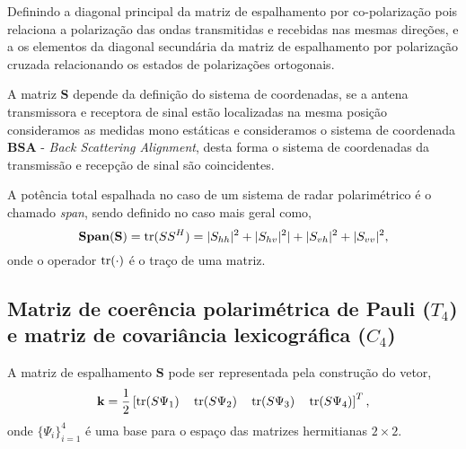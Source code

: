 Definindo a diagonal principal da matriz de espalhamento por co-polarização pois relaciona a polarização das ondas transmitidas e recebidas nas mesmas direções, e a os elementos da diagonal secundária da matriz de espalhamento por polarização cruzada relacionando os estados de polarizações ortogonais.
 
A matriz $\mathbf{S}$ depende da definição do sistema de coordenadas, se a antena transmissora e receptora de sinal estão localizadas na mesma posição consideramos as medidas mono estáticas e consideramos o sistema de coordenada \textbf{BSA} - \textit{Back Scattering Alignment}, desta forma o sistema de coordenadas da transmissão e recepção de sinal são coincidentes.   
 
A potência total espalhada no caso de um sistema de radar polarimétrico é o chamado \textit{span}, sendo definido no caso mais geral como,
\begin{equation}\label{span_geral}
\mathbf{Span(S)} = \operatorname{tr}(SS^H)=|S_{hh}|^2+|S_{hv}|^2|+|S_{vh}|^2+|S_{vv}|^2,
\end{equation}
onde o operador $\operatorname{tr}(\cdot)$ é o traço de uma matriz.


\subsection{Matriz de coerência polarimétrica de Pauli ($T_4$) e matriz de covariância lexicográfica ($C_4$)}
A matriz de espalhamento $\mathbf{S}$ pode ser representada pela construção do vetor,
\begin{equation}\label{def_vet_espalhamento}
\mathbf{k}=\frac{1}{2}\left[\operatorname{tr}(S\Psi_1)\quad\operatorname{tr}(S\Psi_2)\quad \operatorname{tr}(S\Psi_3)\quad \operatorname{tr}(S\Psi_4)\right]^T,
\end{equation}
onde $\{\Psi_i\}_{i=1}^4$ é uma base para o espaço das matrizes hermitianas $2\times 2$.

